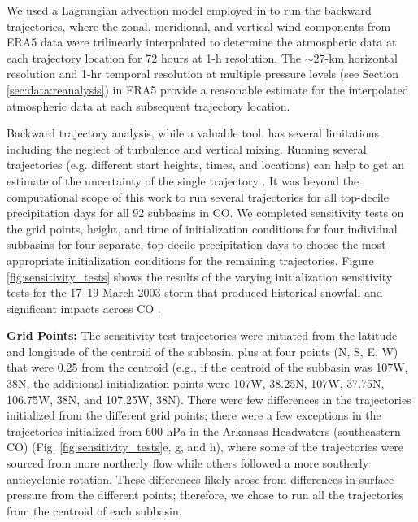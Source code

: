 \documentclass[draft]{agujournal2019}
\begin{document}
We used a Lagrangian advection model employed in  to run the backward trajectories, where the zonal, meridional, and vertical wind components from ERA5 data were trilinearly interpolated to determine the atmospheric data at each trajectory location for 72 hours at 1-h resolution. The $\sim$27-km horizontal resolution and 1-hr temporal resolution at multiple pressure levels (see Section \ref{sec:data:reanalysis}) in ERA5 provide a reasonable estimate for the interpolated atmospheric data at each subsequent trajectory location.

Backward trajectory analysis, while a valuable tool, has several limitations including the neglect of turbulence and vertical mixing. Running several trajectories (e.g. different start heights, times, and locations) can help to get an estimate of the uncertainty of the single trajectory \cite{Stein2015NOAAsSystem}. It was beyond the computational scope of this work to run several trajectories for all top-decile precipitation days for all 92 subbasins in CO. We completed sensitivity tests on the grid points, height, and time of initialization conditions for four individual subbasins for four separate, top-decile precipitation days to choose the most appropriate initialization conditions for the remaining trajectories. Figure \ref{fig:sensitivity_tests} shows the results of the varying initialization sensitivity tests for the 17--19 March 2003 storm that produced historical snowfall and significant impacts across CO \cite{Wesley2013Extreme2003}.

\textbf{Grid Points:} The sensitivity test trajectories were initiated from the latitude and longitude of the centroid of the subbasin, plus at four points (N, S, E, W) that were 0.25\textdegree{} from the centroid (e.g., if the centroid of the subbasin was 107\textdegree W, 38\textdegree N, the additional initialization points were 107\textdegree W, 38.25\textdegree N, 107\textdegree W, 37.75\textdegree N, 106.75\textdegree W, 38\textdegree N, and 107.25\textdegree W, 38\textdegree N). There were few differences in the trajectories initialized from the different grid points; there were a few exceptions in the trajectories initialized from 600 hPa in the Arkansas Headwaters (southeastern CO) (Fig. \ref{fig:sensitivity_tests}e, g, and h), where some of the trajectories were sourced from more northerly flow while others followed a more southerly anticyclonic rotation. These differences likely arose from differences in surface pressure from the different points; therefore, we chose to run all the trajectories from the centroid of each subbasin.
\end{document}
